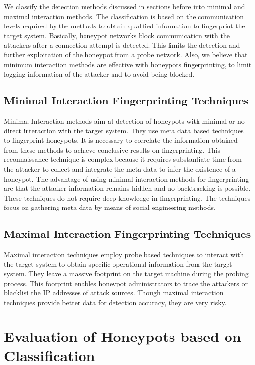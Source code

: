 \documentclass[letterpaper, 10 pt, conference]{ieeeconf}  %
\begin{document}
   We classify the detection methods discussed in sections before into minimal and maximal interaction methods. The classification is based on the communication levels required by the methods to obtain qualified information to fingerprint the target system. Basically, honeypot networks block communication with the attackers after a connection attempt is detected. This limits the detection and further exploitation of the honeypot from a probe network. Also, we believe that minimum interaction methods are effective with honeypots fingerprinting, to limit logging information of the attacker and to avoid being blocked.  

 \subsection{Minimal Interaction Fingerprinting Techniques}
 Minimal Interaction methods aim at detection of honeypots with minimal or no direct interaction with the target system. They use meta data based techniques to fingerprint honeypots. It is necessary to correlate the information obtained from these methods to achieve conclusive results on fingerprinting. This reconnaissance technique is complex because it requires substantiate time from the attacker to collect and integrate the meta data to infer the existence of a honeypot. The advantage of using minimal interaction methods for fingerprinting are that the attacker information remains hidden and no backtracking is possible. These techniques do not require deep knowledge in fingerprinting. The techniques focus on gathering meta data by means of social engineering methods. 
 
 
 \subsection{Maximal Interaction Fingerprinting Techniques}
Maximal interaction techniques employ probe based techniques to interact with the target system to obtain specific operational information from the target system. They leave a massive footprint on the target machine during the probing process. This footprint enables honeypot administrators to trace the attackers or blacklist the IP addresses of attack sources. Though maximal interaction techniques provide better data for detection accuracy, they are very risky.  


 \section{Evaluation of Honeypots based on Classification}
 
\end{document}
